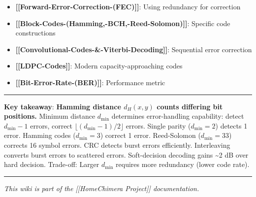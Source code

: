 \begin{itemize}
\tightlist
\item
  \textbf{{[}{[}Forward-Error-Correction-(FEC){]}{]}}: Using redundancy
  for correction
\item
  \textbf{{[}{[}Block-Codes-(Hamming,-BCH,-Reed-Solomon){]}{]}}:
  Specific code constructions
\item
  \textbf{{[}{[}Convolutional-Codes-\&-Viterbi-Decoding{]}{]}}:
  Sequential error correction
\item
  \textbf{{[}{[}LDPC-Codes{]}{]}}: Modern capacity-approaching codes
\item
  \textbf{{[}{[}Bit-Error-Rate-(BER){]}{]}}: Performance metric
\end{itemize}

\begin{center}\rule{0.5\linewidth}{0.5pt}\end{center}

\textbf{Key takeaway}: \textbf{Hamming distance \(d_H(x,y)\) counts
differing bit positions.} Minimum distance \(d_{\min}\) determines
error-handling capability: detect \(d_{\min}-1\) errors, correct
\(\lfloor(d_{\min}-1)/2\rfloor\) errors. Single parity (\(d_{\min}=2\))
detects 1 error. Hamming codes (\(d_{\min}=3\)) correct 1 error.
Reed-Solomon (\(d_{\min}=33\)) corrects 16 symbol errors. CRC detects
burst errors efficiently. Interleaving converts burst errors to
scattered errors. Soft-decision decoding gains \textasciitilde2 dB over
hard decision. Trade-off: Larger \(d_{\min}\) requires more redundancy
(lower code rate).

\begin{center}\rule{0.5\linewidth}{0.5pt}\end{center}

\emph{This wiki is part of the {[}{[}Home\textbar Chimera Project{]}{]}
documentation.}
